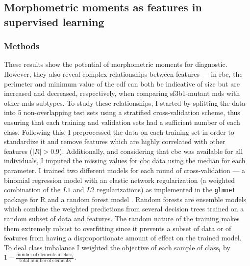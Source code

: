 \subsection{Morphometric moments as features in supervised learning}

\subsubsection{Methods}

These results show the potential of morphometric moments for diagnostic. However, they also reveal complex relationships between features --- in \ac{rbc}, the perimeter and minimum value of the \ac{cdf} can both be indicative of size but are increased and decreased, respectively, when comparing \ac{sf3b1}-mutant \ac{mds} with other \ac{mds} subtypes. To study these relationships, I started by splitting the data into 5 non-overlapping test sets using a stratified cross-validation scheme, thus ensuring that each training and validation sets had a sufficient number of each class. Following this, I preprocessed the data on each training set in order to standardize it and remove features which are highly correlated with other features ($|R|>0.9$). Additionally, and considering that \ac{cbc} was available for all individuals, I imputed the missing values for \ac{cbc} data using the median for each parameter. I trained two different models for each round of cross-validation --- a binomial regression model with an elastic network regularization (a weighted combination of the $L1$ and $L2$ regularizations) as implemented in the \texttt{glmnet} package for R \cite{Friedman2010-gl} and a random forest model \cite{Breiman2001-yz}. Random forests are ensemble models which combine the weighted predictions from several decision trees trained on a random subset of data and features. The random nature of the training makes them extremely robust to overfitting since it prevents a subset of data or of features from having a disproportionate amount of effect on the trained model. To deal class imbalance I weighted the objective of each sample of $\mathrm{class}_i$ by $1-\frac{\mathrm{number\ of\ elements\ in\ class}_i}{\mathrm{total\ number\ of\ elements}}$. 

